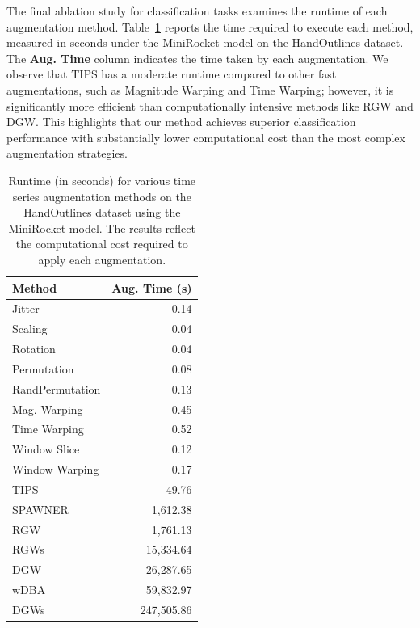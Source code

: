 The final ablation study for classification tasks examines the runtime of each augmentation method. Table~\ref{tab:aug_times_tsc} reports the time required to execute each method, measured in seconds under the MiniRocket model on the HandOutlines dataset. The \textbf{Aug. Time} column indicates the time taken by each augmentation.
We observe that TIPS has a moderate runtime compared to other fast augmentations, such as Magnitude Warping and Time Warping; however, it is significantly more efficient than computationally intensive methods like RGW and DGW. This highlights that our method achieves superior classification performance with substantially lower computational cost than the most complex augmentation strategies.

\begin{table}[h!]
\centering
\begin{tabular}{lr}
\toprule
\textbf{Method} & \textbf{Aug. Time (s)} \\
\midrule
 Jitter         & 0.14 \\
 Scaling        & 0.04 \\
 Rotation       & 0.04 \\
 Permutation    & 0.08 \\
 RandPermutation   & 0.13 \\
 Mag. Warping        & 0.45 \\
 Time Warping       & 0.52 \\
 Window Slice    & 0.12 \\
 Window Warping     & 0.17 \\
 TIPS           & 49.76 \\
SPAWNER        & 1,612.38 \\
RGW            & 1,761.13 \\
RGWs           & 15,334.64 \\
 DGW            & 26,287.65 \\
 wDBA           & 59,832.97 \\
 DGWs           & 247,505.86 \\
\bottomrule
\end{tabular}
\caption{Runtime (in seconds) for various time series augmentation methods on the HandOutlines dataset using the MiniRocket model. The results reflect the computational cost required to apply each augmentation.}

\label{tab:aug_times_tsc}
\end{table}






